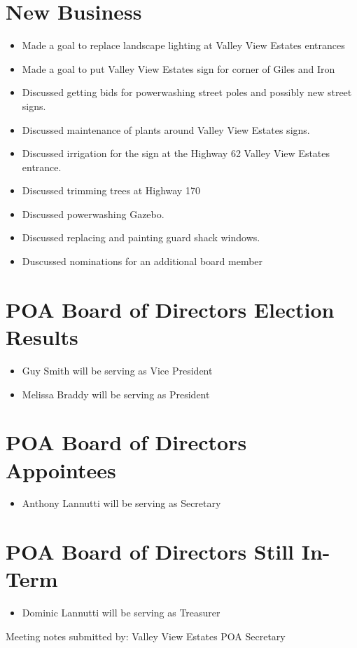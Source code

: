 \documentclass[10pt,a4paper]{article}
\begin{document}
\section*{New Business}
\begin{itemize}
  \item Made a goal to replace landscape lighting at Valley View Estates entrances
  \item Made a goal to put Valley View Estates sign for corner of Giles and Iron
  \item Discussed getting bids for powerwashing street poles and possibly new street signs.
  \item Discussed maintenance of plants around Valley View Estates signs.
  \item Discussed irrigation for the sign at the Highway 62 Valley View Estates entrance.
  \item Discussed trimming trees at Highway 170
  \item Discussed powerwashing Gazebo.
  \item Discussed replacing and painting guard shack windows.
  \item Duscussed nominations for an additional board member
\end{itemize}

\section*{POA Board of Directors Election Results}
\begin{itemize}
  \item Guy Smith will be serving as Vice President
  \item Melissa Braddy will be serving as President
\end{itemize}

\section*{POA Board of Directors Appointees}
\begin{itemize}
  \item Anthony Lannutti will be serving as Secretary
\end{itemize}

\section*{POA Board of Directors Still In-Term}
\begin{itemize}
  \item Dominic Lannutti will be serving as Treasurer
\end{itemize}

\begin{flushleft}
Meeting notes submitted by:\break{}
\@author\break{}
Valley View Estates POA Secretary
\end{flushleft}
\end{document}
